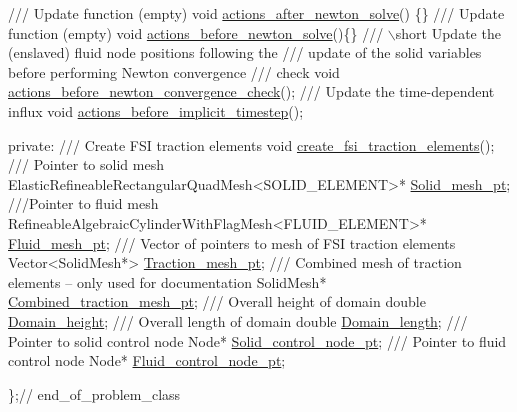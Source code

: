 \begin{DoxyCodeInclude}
\textcolor{comment}{}
\textcolor{comment}{ /// Update function (empty)}
\textcolor{comment}{} \textcolor{keywordtype}{void} \hyperlink{classTurekProblem_ae97d3bad44e12274168e883c966b3983}{actions\_after\_newton\_solve}() \{\}
\textcolor{comment}{}
\textcolor{comment}{ /// Update function (empty)}
\textcolor{comment}{} \textcolor{keywordtype}{void} \hyperlink{classTurekProblem_a889518fdaf0c4215e21981afbfc669bd}{actions\_before\_newton\_solve}()\{\}
\textcolor{comment}{}
\textcolor{comment}{ /// \(\backslash\)short Update the (enslaved) fluid node positions following the}
\textcolor{comment}{ /// update of the solid variables before performing Newton convergence}
\textcolor{comment}{ /// check}
\textcolor{comment}{} \textcolor{keywordtype}{void} \hyperlink{classTurekProblem_aa896171b1a817ca35cba9b723bb15ed2}{actions\_before\_newton\_convergence\_check}();
\textcolor{comment}{}
\textcolor{comment}{ /// Update the time-dependent influx}
\textcolor{comment}{} \textcolor{keywordtype}{void} \hyperlink{classTurekProblem_a4ad226ceec27cb3c3ea4d1ecfd4e573f}{actions\_before\_implicit\_timestep}();

\textcolor{keyword}{private}:
\textcolor{comment}{}
\textcolor{comment}{ /// Create FSI traction elements}
\textcolor{comment}{} \textcolor{keywordtype}{void} \hyperlink{classTurekProblem_ad460a2e860c9425297cf70ee125de10b}{create\_fsi\_traction\_elements}();
\textcolor{comment}{}
\textcolor{comment}{ /// Pointer to solid mesh}
\textcolor{comment}{} ElasticRefineableRectangularQuadMesh<SOLID\_ELEMENT>* \hyperlink{classTurekProblem_a1a449088ae3cc96ade1c58979294afed}{Solid\_mesh\_pt};
\textcolor{comment}{}
\textcolor{comment}{ ///Pointer to fluid mesh}
\textcolor{comment}{} RefineableAlgebraicCylinderWithFlagMesh<FLUID\_ELEMENT>* \hyperlink{classTurekProblem_a18a0daace5dc50db4b93879e4a600e6a}{Fluid\_mesh\_pt};
\textcolor{comment}{}
\textcolor{comment}{ /// Vector of pointers to mesh of FSI traction elements}
\textcolor{comment}{} Vector<SolidMesh*> \hyperlink{classTurekProblem_a0b8588d0f133ffb9a281c5747786f95f}{Traction\_mesh\_pt};
\textcolor{comment}{}
\textcolor{comment}{ /// Combined mesh of traction elements -- only used for documentation}
\textcolor{comment}{} SolidMesh* \hyperlink{classTurekProblem_ac61477b19dfaaba6fb2c7a5c72240ac6}{Combined\_traction\_mesh\_pt};
\textcolor{comment}{}
\textcolor{comment}{ /// Overall height of domain}
\textcolor{comment}{} \textcolor{keywordtype}{double} \hyperlink{classTurekProblem_a24d68af05e815f7164e30f53ce7357ce}{Domain\_height};
\textcolor{comment}{}
\textcolor{comment}{ /// Overall length of domain}
\textcolor{comment}{} \textcolor{keywordtype}{double} \hyperlink{classTurekProblem_aff485942ff327ccfcafd3608910ef635}{Domain\_length};
\textcolor{comment}{}
\textcolor{comment}{ /// Pointer to solid control node}
\textcolor{comment}{} Node* \hyperlink{classTurekProblem_ad65b9a2f833ed9bae3520980c76d1f2f}{Solid\_control\_node\_pt};
\textcolor{comment}{}
\textcolor{comment}{ /// Pointer to fluid control node}
\textcolor{comment}{} Node* \hyperlink{classTurekProblem_a3d297a52fffd79bb7083fd57c2574fff}{Fluid\_control\_node\_pt};
 
\};\textcolor{comment}{// end\_of\_problem\_class}

\end{DoxyCodeInclude}

